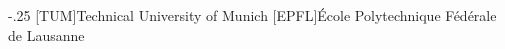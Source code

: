 \documentclass[headsepline,footsepline,footinclude=false,oneside,fontsize=11pt,paper=a4,listof=totoc,bibliography=totoc]{scrbook} %
\begin{document}


\frontmatter{}





\tableofcontents{}

\mainmatter{}



\appendix{}


\begin{acronym}
	\itemsep-.25\baselineskip
	[TUM]{Technical University of Munich}
	[EPFL]{École Polytechnique Fédérale de Lausanne}
\end{acronym}

\listoffigures{}
\listoftables{}
\printbibliography{}
\end{document}
